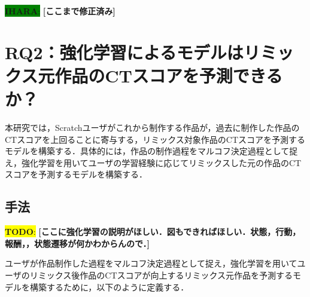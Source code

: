 \documentclass[submit,techrep,noauthor]{ipsj}
\newcommand{\todo}[1]{\colorbox{yellow}{{\bf TODO}:}{\color{red} {\textbf{[#1]}}}}
\newcommand{\ihara}[1]{\colorbox{green}{{\bf IHARA}:}{\color{blue} {\textbf{[#1]}}}}
\begin{document}
\ihara{ここまで修正済み}

\section{RQ2：強化学習によるモデルはリミックス元作品のCTスコアを予測できるか？}
\label{sec:rq2}

本研究では，Scratchユーザがこれから制作する作品が，過去に制作した作品のCTスコアを上回ることに寄与する，リミックス対象作品のCTスコアを予測するモデルを構築する．具体的には，作品の制作過程をマルコフ決定過程として捉え，強化学習を用いてユーザの学習経験に応じてリミックスした元の作品のCTスコアを予測するモデルを構築する．

\subsection{手法}
\todo{ここに強化学習の説明がほしい．図もできればほしい．状態，行動，報酬，，状態遷移が何かわからんので．}

ユーザが作品制作した過程をマルコフ決定過程として捉え，強化学習を用いてユーザのリミックス後作品のCTスコアが向上するリミックス元作品を予測するモデルを構築するために，以下のように定義する．
\end{document}
